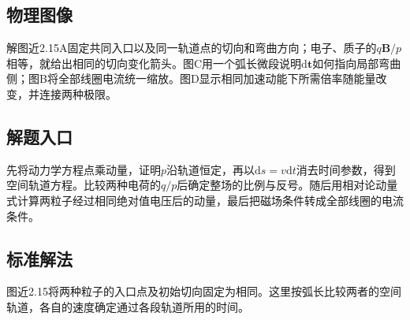 \documentclass[UTF8,fontset=fandol,a4paper,11pt]{ctexart}
\begin{document}


\subsection*{物理图像}

解图近2.15A固定共同入口以及同一轨道点的切向和弯曲方向；电子、质子的$q\boldsymbol B/p$相等，就给出相同的切向变化箭头。图C用一个弧长微段说明$\mathrm d\boldsymbol t$如何指向局部弯曲侧；图B将全部线圈电流统一缩放。图D显示相同加速动能下所需倍率随能量改变，并连接两种极限。



\subsection*{解题入口}

先将动力学方程点乘动量，证明$p$沿轨道恒定，再以$\mathrm ds=v\mathrm dt$消去时间参数，得到空间轨道方程。比较两种电荷的$q/p$后确定整场的比例与反号。随后用相对论动量式计算两粒子经过相同绝对值电压后的动量，最后把磁场条件转成全部线圈的电流条件。



\subsection*{标准解法}


图近2.15将两种粒子的入口点及初始切向固定为相同。这里按弧长比较两者的空间轨道，各自的速度确定通过各段轨道所用的时间。
\end{document}
